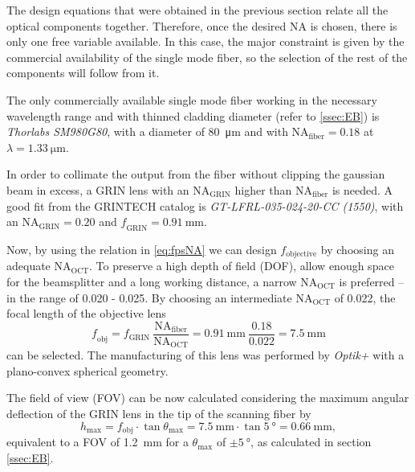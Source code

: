 \documentclass[10pt]{iopart}
\begin{document}
The design equations that were obtained in the previous section relate all the optical components together. Therefore, once the desired NA is chosen, there is only one free variable available. In this case, the major constraint is given by the commercial availability of the single mode fiber, so the selection of the rest of the components will follow from it.

The only commercially available single mode fiber working in the necessary wavelength range and with thinned cladding diameter (refer to \autoref{ssec:EB}) is \textit{Thorlabs SM980G80}, with a diameter of \SI{80}{\micro\meter} and with $\mathrm{NA_\mathrm{fiber}} = 0.18$ at $\lambda = \SI{1.33}{\micro\meter}$. 

In order to collimate the output from the fiber without clipping the gaussian beam in excess, a GRIN lens with an $\mathrm{NA_{GRIN}}$ higher than $\mathrm{NA_{fiber}}$ is needed. A good fit from the GRINTECH catalog is \textit{GT-LFRL-035-024-20-CC (1550)}, with an $\mathrm{NA_\mathrm{GRIN}} = 0.20$ and $\mathit{f_\mathrm{GRIN}} = \SI{0.91}{\milli\meter}$. 

Now, by using the relation in \autoref{eq:fpsNA} we can design $f_\mathrm{objective}$ by choosing an adequate $\mathrm{NA_\mathrm{OCT}}$. To preserve a high depth of field (DOF), allow enough space for the beamsplitter and a long working distance, a narrow $\mathrm{NA_\mathrm{OCT}}$ is preferred -- in the range of 0.020 - 0.025. By choosing an intermediate $\mathrm{NA_\mathrm{OCT}}$ of 0.022, the focal length of the objective lens 
\begin{equation}
\mathit{f_\mathrm{obj}} = f_\mathrm{GRIN}\ \frac{\mathrm{NA_\mathrm{fiber}}}{\mathrm{NA_\mathrm{OCT}}}  = \SI{0.91}{\milli\meter}\ \frac{0.18}{0.022} = \SI{7.5}{\milli\meter}
\end{equation}
can be selected. The manufacturing of this lens was performed by \textit{Optik+} with a plano-convex spherical geometry.

The field of view (FOV) can be now calculated considering the maximum angular deflection of the GRIN lens in the tip of the scanning fiber by 
\begin{equation}
h_\mathrm{max} = f_\mathrm{obj}\cdot \tan  \theta_\mathrm{max} = \SI{7.5}{\milli\meter} \cdot \tan \SI{5}{\degree} = \SI{0.66}{\milli\meter}, 
\end{equation}
equivalent to a FOV of \SI{1.2}{\milli\meter} for a $\theta_\mathrm{max} $ of $ \pm \SI{5}{\degree}$, as calculated in section \autoref{ssec:EB}.
\end{document}
